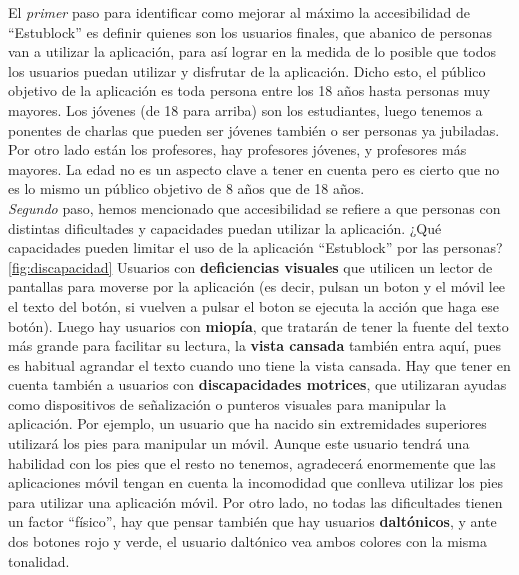 El \emph{primer} paso para identificar como mejorar al máximo la accesibilidad de ``Estublock'' es definir quienes son los usuarios finales, que abanico de personas van a utilizar la aplicación, para así lograr en la medida de lo posible que todos los usuarios puedan utilizar y disfrutar de la aplicación. Dicho esto, el público objetivo de la aplicación es toda persona entre los 18 años hasta personas muy mayores. Los jóvenes (de 18 para arriba) son los estudiantes, luego tenemos a ponentes de charlas que pueden ser jóvenes también o ser personas ya jubiladas. Por otro lado están los profesores, hay profesores jóvenes, y profesores más mayores. La edad no es un aspecto clave a tener en cuenta pero es cierto que no es lo mismo un público objetivo de 8 años que de 18 años. \\

\emph{Segundo} paso, hemos mencionado que accesibilidad se refiere a que personas con distintas dificultades y capacidades puedan utilizar la aplicación. ¿Qué capacidades pueden limitar el uso de la aplicación ``Estublock'' por las personas?\ref{fig:discapacidad} Usuarios con \textbf{deficiencias visuales} que utilicen un lector de pantallas para moverse por la aplicación (es decir, pulsan un boton y el móvil lee el texto del botón, si vuelven a pulsar el boton se ejecuta la acción que haga ese botón). Luego hay usuarios con \textbf{miopía}, que tratarán de tener la fuente del texto más grande para facilitar su lectura, la \textbf{vista cansada} también entra aquí, pues es habitual agrandar el texto cuando uno tiene la vista cansada. Hay que tener en cuenta también a usuarios con \textbf{discapacidades motrices}, que utilizaran ayudas como dispositivos de señalización o punteros visuales para manipular la aplicación. Por ejemplo, un usuario que ha nacido sin extremidades superiores utilizará los pies para manipular un móvil. Aunque este usuario tendrá una habilidad con los pies que el resto no tenemos, agradecerá enormemente que las aplicaciones móvil tengan en cuenta la incomodidad que conlleva utilizar los pies para utilizar una aplicación móvil. Por otro lado, no todas las dificultades tienen un factor ``físico'', hay que pensar también que hay usuarios \textbf{daltónicos}, y ante dos botones rojo y verde, el usuario daltónico vea ambos colores con la misma tonalidad. \\

